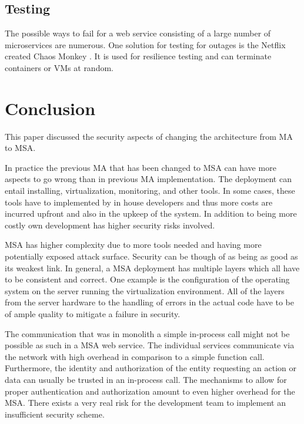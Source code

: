 \subsection{Testing}
\begin{sloppypar}
    The possible ways to fail for a web service consisting of a large number of
    microservices are numerous. One solution for testing for outages is the
    Netflix created Chaos Monkey \citep{chaosmonkey}. It is used for resilience
    testing and can terminate containers or VMs at random.
\end{sloppypar}




\section{Conclusion}
\begin{sloppypar}
    This paper discussed the security aspects of changing the architecture from
    MA to MSA.
\end{sloppypar}
\begin{sloppypar}
    In practice the previous MA that has been changed to MSA can have more
    aspects to go wrong than in previous MA implementation. The deployment can
    entail installing, virtualization, monitoring, and other tools. In some
    cases, these tools have to implemented by in house developers and thus more
    costs are incurred upfront and also in the upkeep of the system. In addition
    to being more costly own development has higher security risks involved.
\end{sloppypar}
\begin{sloppypar}
    MSA has higher complexity due to more tools needed and having more
    potentially exposed attack surface. Security can be though of as being as
    good as its weakest link. In general, a MSA deployment has multiple layers
    which all have to be consistent and correct. One example is the
    configuration of the operating system on the server running the
    virtualization environment. All of the layers from the server hardware to
    the handling of errors in the actual code have to be of ample quality to
    mitigate a failure in security.
\end{sloppypar}
\begin{sloppypar}
    The communication that was in monolith a simple in-process call might not be
    possible as such in a MSA web service. The individual services communicate
    via the network with high overhead in comparison to a simple function call.
    Furthermore, the identity and authorization of the entity requesting an
    action or data can usually be trusted in an in-process call. The mechanisms
    to allow for proper authentication and authorization amount to even higher
    overhead for the MSA. There exists a very real risk for the development team
    to implement an insufficient security scheme.
\end{sloppypar}
